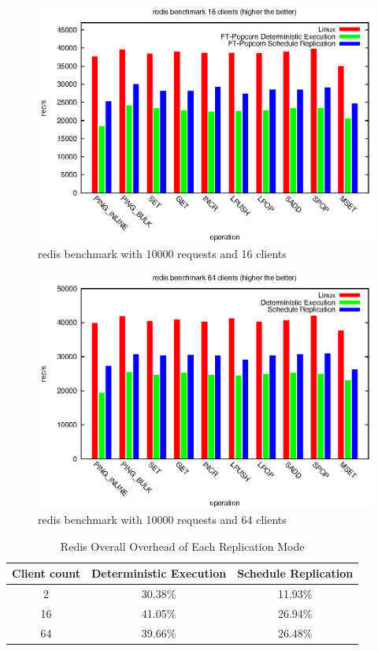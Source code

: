 \begin{figure}
\centering
\includegraphics[width=0.8\columnwidth]{figures/redis_16}
\caption{redis benchmark with 10000 requests and 16 clients}
\label{f:redis_16}
\end{figure}

\begin{figure}
\centering
\includegraphics[width=0.8\columnwidth]{figures/redis_64}
\caption{redis benchmark with 10000 requests and 64 clients}
\label{f:redis_64}
\end{figure}

\begin{table}
\caption{Redis Overall Overhead of Each Replication Mode}
\begin{center}
 \begin{tabular}{c | c | c}
Client count & Deterministic Execution & Schedule Replication \\ \hline
 2 & 30.38\% & 11.93\% \\ \hline
 16 & 41.05\% & 26.94\% \\ \hline
 64 & 39.66\% & 26.48\% \\ \hline
 \end{tabular}
\end{center}
\label{t:redis_overall}
\end{table}

